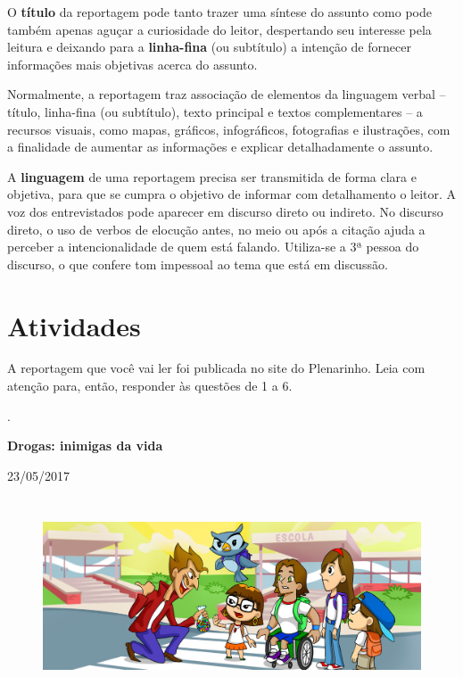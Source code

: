 \begin{itemize}
\begin{itemize}
{O \textbf{título} da reportagem pode tanto trazer uma síntese do assunto
como pode também apenas aguçar a curiosidade do leitor, despertando seu
interesse pela leitura e deixando para a \textbf{linha-fina} (ou
subtítulo) a intenção de fornecer informações mais objetivas acerca do
assunto.

Normalmente, a reportagem traz associação de elementos da linguagem
verbal -- título, linha-fina (ou subtítulo), texto principal e textos
complementares -- a recursos visuais, como mapas, gráficos,
infográficos, fotografias e ilustrações, com a finalidade de aumentar as
informações e explicar detalhadamente o assunto.

A \textbf{linguagem} de uma reportagem precisa ser transmitida de forma
clara e objetiva, para que se cumpra o objetivo de informar com
detalhamento o leitor. A voz dos entrevistados pode aparecer em discurso
direto ou indireto. No discurso direto, o uso de verbos de elocução
antes, no meio ou após a citação ajuda a perceber a intencionalidade de
quem está falando. Utiliza-se a 3ª pessoa do discurso, o que confere tom
impessoal ao tema que está em discussão.
}

\section{Atividades}

A reportagem que você vai ler foi publicada no site do Plenarinho. Leia
com atenção para, então, responder às questões de 1 a 6.

.

\textbf{Drogas: inimigas da vida}

23/05/2017

\begin{figure}
\centering
\includegraphics[width=5.90556in,height=2.30417in]{./_SAEB_9_POR/media/image17.jpeg}
\caption{}
\end{figure}


\end{itemize}
\end{itemize}

